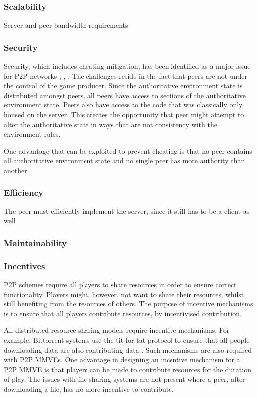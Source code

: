 \subsubsection{Scalability}
Server and peer bandwidth requirements

\subsubsection{Security}

Security, which includes cheating mitigation, has been identified as a major issue for P2P networks \cite{knutsson_p2p_first}, \cite{challenges_p2p_gaming}, \cite{cheat_proof_event_ordering}. The challenges reside in the fact that peers are not under the control of the game producer. Since the authoritative environment state is distributed amongst peers, all peers have access to sections of the authoritative environment state. Peers also have access to the code that was classically only housed on the server. This creates the opportunity that peer might attempt to alter the authoritative state in ways that are not consistency with the environment rules.

One advantage that can be exploited to prevent cheating is that no peer contains all authoritative environment state and no single peer has more authority than another.

\subsubsection{Efficiency}
The peer must efficiently implement the server, since it still has to be a client as well

\subsubsection{Maintainability}

\subsubsection{Incentives}

P2P schemes require all players to share resources in order to ensure correct functionality. Players might, however, not want to share their resources, whilst still benefiting from the resources of others. The purpose of incentive mechanisms is to ensure that all players contribute resources, by incentivised contribution.

All distributed resource sharing models require incentive mechanisms. For example, Bittorrent systems use the tit-for-tat protocol to ensure that all people downloading data are also contributing data \cite{tit_for_tat}. Such mechanisms are also required with P2P MMVEs. One advantage in designing an incentive mechanism for a P2P MMVE is that players can be made to contribute resources for the duration of play. The issues with file sharing systems are not present where a peer, after downloading a file, has no more incentive to contribute.

